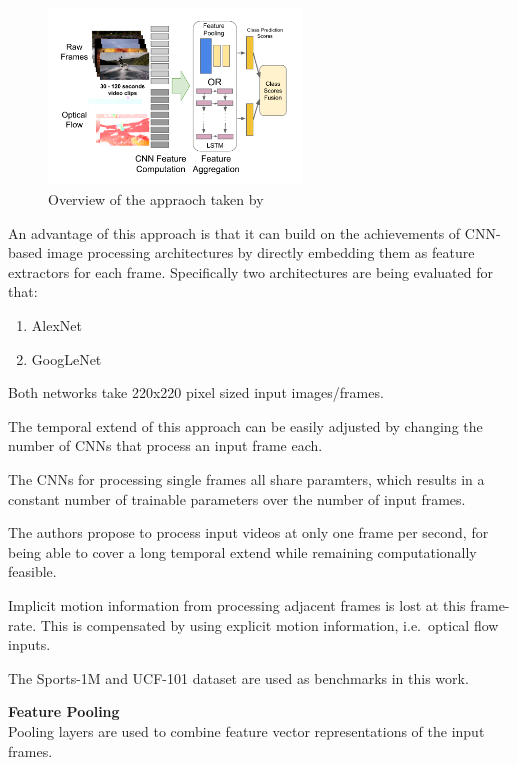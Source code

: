 \begin{figure}[H]
    \centering
    \includegraphics[width=0.6\textwidth]{img_deep/beyondshort_overview}
    \caption{Overview of the appraoch taken by \textcite{ng_beyond_2015}}
    \label{fig:beyondshort_overview}
\end{figure}

An advantage of this approach is that it can build on the achievements of CNN-based image processing architectures by directly embedding them as feature extractors for each frame.
Specifically two architectures are being evaluated for that:
\begin{enumerate}
    \item AlexNet \cite{krizhevsky_imagenet_2012}
    \item GoogLeNet \cite{szegedy_going_2015}
\end{enumerate}

Both networks take 220x220 pixel sized input images/frames.

The temporal extend of this approach can be easily adjusted by changing the number of CNNs that process an input frame each.

The CNNs for processing single frames all share paramters, which results in a constant number of trainable parameters over the number of input frames.

The authors propose to process input videos at only one frame per second, for being able to cover a long temporal extend while remaining computationally feasible.

Implicit motion information from processing adjacent frames is lost at this frame-rate.
This is compensated by using explicit motion information, i.e.\ optical flow inputs.

The Sports-1M and UCF-101 dataset are used as benchmarks in this work.

\textbf{Feature Pooling}\\
Pooling layers are used to combine feature vector representations of the input frames.


